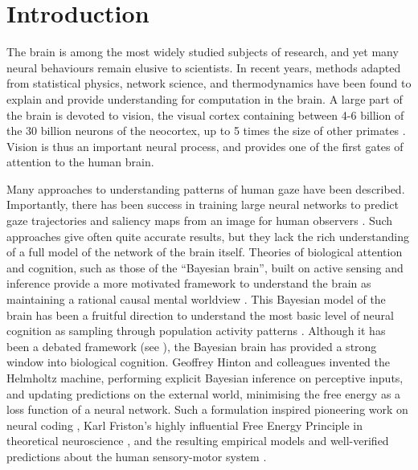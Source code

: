 \chapter*{Introduction}
The brain is among the most widely studied subjects of research, and yet many neural behaviours remain elusive to scientists. In recent years, methods adapted from statistical physics, network science, and thermodynamics have been found to explain and provide understanding for computation in the brain. A large part of the brain is devoted to vision, the visual cortex containing between 4-6 billion of the 30 billion neurons of the neocortex, up to 5 times the size of other primates \cite{wandell_visual_2009, andrews_correlated_1997}. Vision is thus an important neural process, and provides one of the first gates of attention to the human brain.

Many approaches to understanding patterns of human gaze have been described. Importantly, there has been success in training large neural networks to predict gaze trajectories \cite{bhandari_modeling_2025, wu_gitnet_2026,abdelrahman_deep_2026,bremer_predicting_2021,ozdel_gaze-guided_2024,akinyelu_convolutional_2022} and saliency maps from an image for human observers \cite{kummerer_modeling_2025,cornia_deep_2016, cornia_predicting_2018, kammerer2016deepgaze2, huang_salicon_2015, bujia_modeling_2022}. Such approaches give often quite accurate results, but they lack the rich understanding of a full model of the network of the brain itself. Theories of biological attention and cognition, such as those of the ``Bayesian brain'', built on active sensing and inference provide a more motivated framework to understand the brain as maintaining a rational causal mental worldview \cite{knill_bayesian_2004, costa_probabilistic_2024, bujia_modeling_2022, tan_theta_2024}. This Bayesian model of the brain has been a fruitful direction to understand the most basic level of neural cognition as sampling through population activity patterns \cite{orban_neural_2016, NIPS2002_a486cd07, beck_probabilistic_2008, zhu_autocorrelated_2024}. Although it has been a debated framework (see \cite{mangalam_myth_2025}), the Bayesian brain has provided a strong window into biological cognition. Geoffrey Hinton and colleagues invented the Helmholtz machine, performing explicit Bayesian inference on perceptive inputs, and updating predictions on the external world, minimising the free energy as a loss function of a neural network. Such a formulation inspired pioneering work on neural coding \cite{Lange2023-sn, beck_probabilistic_2008}, Karl Friston's highly influential Free Energy Principle in theoretical neuroscience \cite{Friston2010-aa, Parr2025-xh}, and the resulting empirical models and well-verified predictions about the human sensory-motor system \cite{kording_bayesian_2004,rao_predictive_1999,koch_predicting_1999}.